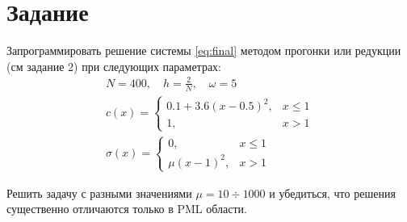 \documentclass[12pt]{article}
\begin{document}
\section{Задание} 
Запрограммировать решение системы \eqref{eq:final} методом прогонки или редукции
(см задание 2) при следующих параметрах:
\begin{gather*}
N = 400,\quad h = \frac{2}{N},\quad \omega = 5\\
c(x) = 
\begin{cases}
0.1 + 3.6 (x - 0.5)^2, & x \leq 1\\
1, & x > 1
\end{cases}
\\
\sigma(x) = 
\begin{cases}
0, & x \leq 1\\
\mu (x - 1)^2, & x > 1
\end{cases}
\end{gather*}

Решить задачу с разными значениями $\mu = 10 \div 1000$ и убедиться, что решения
существенно
отличаются только в PML области.
\end{document}
